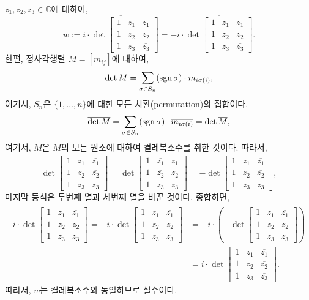 $z_1, z_2, z_3 \in\mathbb C$에 대하여,
\[
w:= \overline{i\cdot \det \begin{bmatrix}
1 & z_1 & \overline{z_1} \\
1 & z_2 & \overline{z_2} \\
1 & z_3 & \overline{z_3}
\end{bmatrix}}
= -i\cdot \overline{\det \begin{bmatrix}
1 & z_1 & \overline{z_1} \\
1 & z_2 & \overline{z_2} \\
1 & z_3 & \overline{z_3}
\end{bmatrix}}.
\]
한편, 정사각행렬 $M=[m_{ij}]$에 대하여,
\[
\det M = \sum_{\sigma\in S_n} (\mathop{\mathrm{sgn}} \sigma) \cdot m_{i\sigma(i)},
\]
여기서, $S_n$은 $\{1,\ldots, n\}$에 대한 모든 치환(permutation)의 집합이다.
\[
\overline{\det M} = \sum_{\sigma\in S_n} (\mathop{\mathrm{sgn}} \sigma) \cdot
\overline{m_{i\sigma(i)}} = \det \overline{M},
\]
여기서, $\overline{M}$은 $M$의 모든 원소에 대하여 켤레복소수를 취한 것이다.
따라서,
\[
\overline{\det \begin{bmatrix}
1 & z_1 & \overline{z_1} \\
1 & z_2 & \overline{z_2} \\
1 & z_3 & \overline{z_3}
\end{bmatrix}}
= \det \begin{bmatrix}
1 & \overline{z_1} & z_1 \\
1 & \overline{z_2} & z_2 \\
1 & \overline{z_3} & z_3
\end{bmatrix}
= -  \det \begin{bmatrix}
1 & z_1 & \overline{z_1} \\
1 & z_2 & \overline{z_2} \\
1 & z_3 & \overline{z_3}
\end{bmatrix},
\]
마지막 등식은 두번째 열과 세번째 열을 바꾼 것이다.
종합하면,
\begin{align*}
\overline{i\cdot \det \begin{bmatrix}
1 & z_1 & \overline{z_1} \\
1 & z_2 & \overline{z_2} \\
1 & z_3 & \overline{z_3}
\end{bmatrix}}
= -i\cdot \overline{\det \begin{bmatrix}
1 & z_1 & \overline{z_1} \\
1 & z_2 & \overline{z_2} \\
1 & z_3 & \overline{z_3}
\end{bmatrix}}
& = -i \cdot \left(
-  \det \begin{bmatrix}
1 & z_1 & \overline{z_1} \\
1 & z_2 & \overline{z_2} \\
1 & z_3 & \overline{z_3}
\end{bmatrix}
\right) \\
& = i \cdot  \det \begin{bmatrix}
1 & z_1 & \overline{z_1} \\
1 & z_2 & \overline{z_2} \\
1 & z_3 & \overline{z_3}
\end{bmatrix}.
\end{align*}
따라서, $w$는 켤레복소수와 동일하므로 실수이다.

